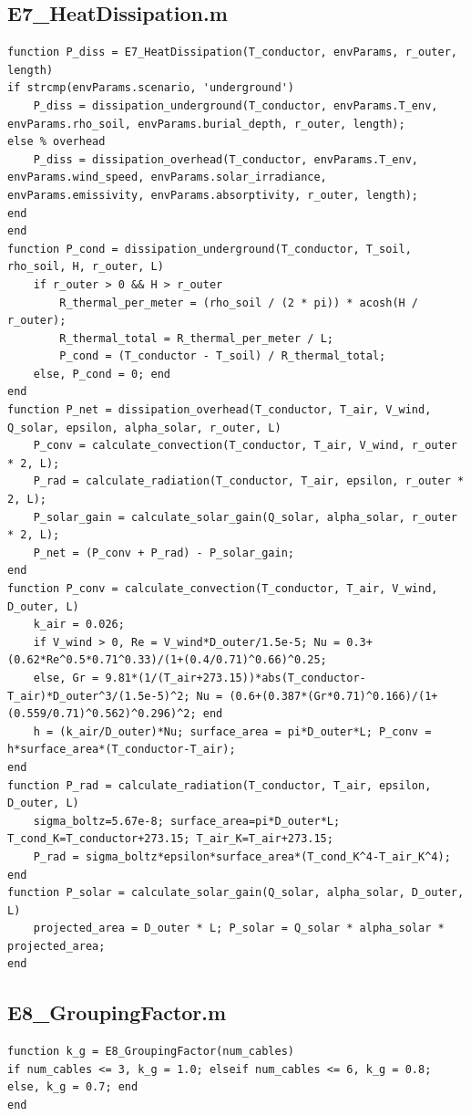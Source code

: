 \documentclass[12pt, a4paper]{article}
\begin{document}
\subsection{E7\_HeatDissipation.m}
\begin{lstlisting}[caption={Contains the physical models for heat dissipation (underground and overhead).}, label={lst:E7}]
function P_diss = E7_HeatDissipation(T_conductor, envParams, r_outer, length)
if strcmp(envParams.scenario, 'underground')
    P_diss = dissipation_underground(T_conductor, envParams.T_env, envParams.rho_soil, envParams.burial_depth, r_outer, length);
else % overhead
    P_diss = dissipation_overhead(T_conductor, envParams.T_env, envParams.wind_speed, envParams.solar_irradiance, envParams.emissivity, envParams.absorptivity, r_outer, length);
end
end
function P_cond = dissipation_underground(T_conductor, T_soil, rho_soil, H, r_outer, L)
    if r_outer > 0 && H > r_outer
        R_thermal_per_meter = (rho_soil / (2 * pi)) * acosh(H / r_outer);
        R_thermal_total = R_thermal_per_meter / L;
        P_cond = (T_conductor - T_soil) / R_thermal_total;
    else, P_cond = 0; end
end
function P_net = dissipation_overhead(T_conductor, T_air, V_wind, Q_solar, epsilon, alpha_solar, r_outer, L)
    P_conv = calculate_convection(T_conductor, T_air, V_wind, r_outer * 2, L);
    P_rad = calculate_radiation(T_conductor, T_air, epsilon, r_outer * 2, L);
    P_solar_gain = calculate_solar_gain(Q_solar, alpha_solar, r_outer * 2, L);
    P_net = (P_conv + P_rad) - P_solar_gain;
end
function P_conv = calculate_convection(T_conductor, T_air, V_wind, D_outer, L)
    k_air = 0.026;
    if V_wind > 0, Re = V_wind*D_outer/1.5e-5; Nu = 0.3+(0.62*Re^0.5*0.71^0.33)/(1+(0.4/0.71)^0.66)^0.25;
    else, Gr = 9.81*(1/(T_air+273.15))*abs(T_conductor-T_air)*D_outer^3/(1.5e-5)^2; Nu = (0.6+(0.387*(Gr*0.71)^0.166)/(1+(0.559/0.71)^0.562)^0.296)^2; end
    h = (k_air/D_outer)*Nu; surface_area = pi*D_outer*L; P_conv = h*surface_area*(T_conductor-T_air);
end
function P_rad = calculate_radiation(T_conductor, T_air, epsilon, D_outer, L)
    sigma_boltz=5.67e-8; surface_area=pi*D_outer*L; T_cond_K=T_conductor+273.15; T_air_K=T_air+273.15;
    P_rad = sigma_boltz*epsilon*surface_area*(T_cond_K^4-T_air_K^4);
end
function P_solar = calculate_solar_gain(Q_solar, alpha_solar, D_outer, L)
    projected_area = D_outer * L; P_solar = Q_solar * alpha_solar * projected_area;
end
\end{lstlisting}

\subsection{E8\_GroupingFactor.m}
\begin{lstlisting}[caption={Provides a derating factor for grouped cables.}, label={lst:E8}]
function k_g = E8_GroupingFactor(num_cables)
if num_cables <= 3, k_g = 1.0; elseif num_cables <= 6, k_g = 0.8; else, k_g = 0.7; end
end
\end{lstlisting}
\end{document}
